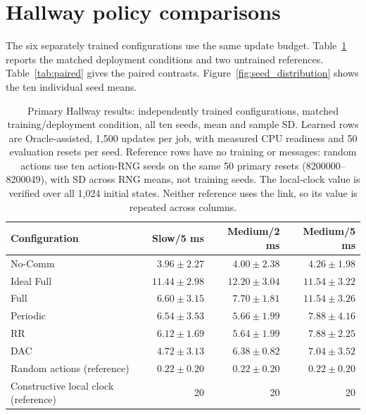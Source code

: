 \documentclass[pdflatex,sn-mathphys-num]{sn-jnl}
\begin{document}
\section{Hallway policy comparisons}
The six separately trained configurations use the same update budget. Table~\ref{tab:primary} reports the matched deployment conditions and two untrained references. Table~\ref{tab:paired} gives the paired contrasts. Figure~\ref{fig:seed_distribution} shows the ten individual seed means.
\begin{table}[htbp]\centering\setlength{\tabcolsep}{1.3pt}\small
\caption{Primary Hallway results: independently trained configurations, matched training/deployment condition, all ten seeds, mean and sample SD. Learned rows are Oracle-assisted, 1,500 updates per job, with measured CPU readiness and 50 evaluation resets per seed. Reference rows have no training or messages: random actions use ten action-RNG seeds on the same 50 primary resets (8200000--8200049), with SD across RNG means, not training seeds. The local-clock value is verified over all 1,024 initial states. Neither reference uses the link, so its value is repeated across columns.}\label{tab:primary}
\vspace{2.5mm}
{\footnotesize\setlength{\tabcolsep}{1.3pt}\begin{tabular}{lrrr}\toprule
Configuration & Slow/5 ms & Medium/2 ms & Medium/5 ms\\\midrule
No-Comm & $3.96\pm2.27$ & $4.00\pm2.38$ & $4.26\pm1.98$\\
Ideal Full & $11.44\pm2.98$ & $12.20\pm3.04$ & $11.54\pm3.22$\\
Full & $6.60\pm3.15$ & $7.70\pm1.81$ & $11.54\pm3.26$\\
Periodic & $6.54\pm3.53$ & $5.66\pm1.99$ & $7.88\pm4.16$\\
RR & $6.12\pm1.69$ & $5.64\pm1.99$ & $7.88\pm2.25$\\
DAC & $4.72\pm3.13$ & $6.38\pm0.82$ & $7.04\pm3.52$\\
\midrule Random actions (reference) & $0.22\pm0.20$ & $0.22\pm0.20$ & $0.22\pm0.20$\\
Constructive local clock (reference) & 20 & 20 & 20\\
\bottomrule\end{tabular}}\end{table}
\end{document}
